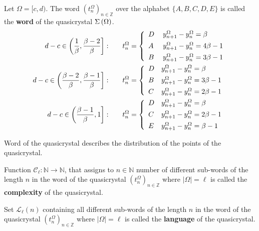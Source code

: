 \documentclass[text.tex]{subfiles}
\begin{document}
\begin{definition}
Let $\Omega = [c,d)$. The word $\left(t_n^\Omega\right)_{n\in\mathbb{Z}}$ over the alphabet $\{A,B,C,D,E\}$ is called the \textbf{word} of the quasicrystal $\Sigma\left(\Omega\right)$.
\begin{align*}
d-c \in \left( \frac{1}{\beta}, \frac{\beta - 2}{\beta} \right]:& \qquad
		t_n^\Omega = \left\{ \begin{array}{l l}
			D & y_{n+1}^\Omega - y_n^\Omega = \beta	\\[1.5mm]
			A~& y_{n+1}^\Omega - y_n^\Omega = 4\beta-1\\[1.5mm]
			B & y_{n+1}^\Omega - y_n^\Omega = 3\beta-1
		\end{array} \right.
\\
d-c \in \left( \frac{\beta-2}{\beta}, \frac{\beta-1}{\beta} \right]:& \qquad
		t_n^\Omega = \left\{ \begin{array}{l l}
			D & y_{n+1}^\Omega - y_n^\Omega = \beta	\\[1.5mm]
			B & y_{n+1}^\Omega - y_n^\Omega = 3\beta-1\\[1.5mm]
			C & y_{n+1}^\Omega - y_n^\Omega = 2\beta-1
		\end{array} \right.
\\
d-c \in \left( \frac{\beta-1}{\beta}, 1 \right]:& \qquad
		t_n^\Omega = \left\{ \begin{array}{l l}
			D & y_{n+1}^\Omega - y_n^\Omega = \beta	\\[1.5mm]
			C & y_{n+1}^\Omega - y_n^\Omega = 2\beta-1\\[1.5mm]
			E & y_{n+1}^\Omega - y_n^\Omega = \beta-1
		\end{array} \right.
\end{align*}
\end{definition}

\begin{remark}
Word of the quasicrystal describes the distribution of the points of the quasicrystal.
\end{remark}

\begin{definition}
Function $\mathcal{C}_\ell: \mathbb{N} \to \mathbb{N}$, that assigns to $n\in\mathbb{N}$ number of different sub-words of the length $n$ in the word of the quasicrystal $\left(t_n^\Omega\right)_{n\in\mathbb{Z}}$ where $|\Omega| = \ell$ is called the \textbf{complexity} of the quasicrystal.
\end{definition}

\begin{definition}
Set $\mathcal{L}_\ell(n)$ containing all different sub-words of the length $n$ in the word of the quasicrystal $\left(t_n^\Omega\right)_{n\in\mathbb{Z}}$ where $|\Omega| = \ell$ is called the \textbf{language} of the quasicrystal.
\end{definition}
\end{document}
